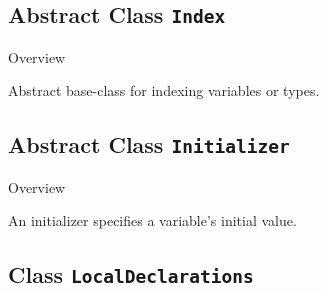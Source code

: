 \subsection{Abstract Class \bfseries \texttt{Index}\normalfont}
\label{cls:uppaal::declarations::Index} 
	
	\begin{longdescription}
		\item[Overview] 		
				

	

		Abstract base-class for indexing variables or types.		
		
	
	
	\end{longdescription}
	

\subsection{Abstract Class \bfseries \texttt{Initializer}\normalfont}
\label{cls:uppaal::declarations::Initializer} 
	
	\begin{longdescription}
		\item[Overview] 		
				

	

		An initializer specifies a variable's initial value.		
		
	
	
	\end{longdescription}
	

\subsection{Class \bfseries \texttt{LocalDeclarations}\normalfont}
\label{cls:uppaal::declarations::LocalDeclarations} 
	
